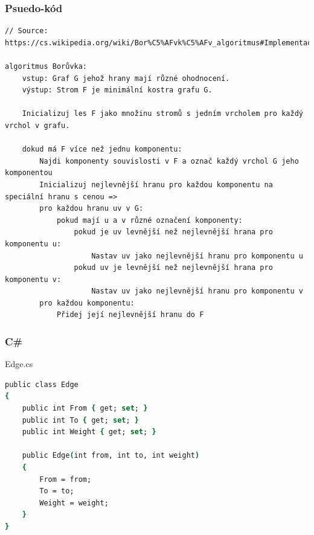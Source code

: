 \documentclass[11pt]{article}
\begin{document}
\subsubsection{Psuedo-kód}
\begin{lstlisting}
// Source: https://cs.wikipedia.org/wiki/Bor%C5%AFvk%C5%AFv_algoritmus#Implementace_v_pseudok%C3%B3du

algoritmus Borůvka:
    vstup: Graf G jehož hrany mají různé ohodnocení.
    výstup: Strom F je minimální kostra grafu G.

    Inicializuj les F jako množinu stromů s jedním vrcholem pro každý vrchol v grafu.

    dokud má F více než jednu komponentu:
        Najdi komponenty souvislosti v F a označ každý vrchol G jeho komponentou
        Inicializuj nejlevnější hranu pro každou komponentu na speciální hranu s cenou =>
        pro každou hranu uv v G:
            pokud mají u a v různé označení komponenty:
                pokud je uv levnější než nejlevnější hrana pro komponentu u:
                    Nastav uv jako nejlevnější hranu pro komponentu u
                pokud uv je levnější než nejlevnější hrana pro komponentu v:
                    Nastav uv jako nejlevnější hranu pro komponentu v
        pro každou komponentu:
            Přidej její nejlevnější hranu do F
\end{lstlisting}

\subsubsection{C\#}

\medbreak\noindent
Edge.cs
\begin{lstlisting}[language=csh]
public class Edge
{
    public int From { get; set; }
    public int To { get; set; }
    public int Weight { get; set; }

    public Edge(int from, int to, int weight)
    {
        From = from;
        To = to;
        Weight = weight;
    }
}
\end{lstlisting}
\end{document}
